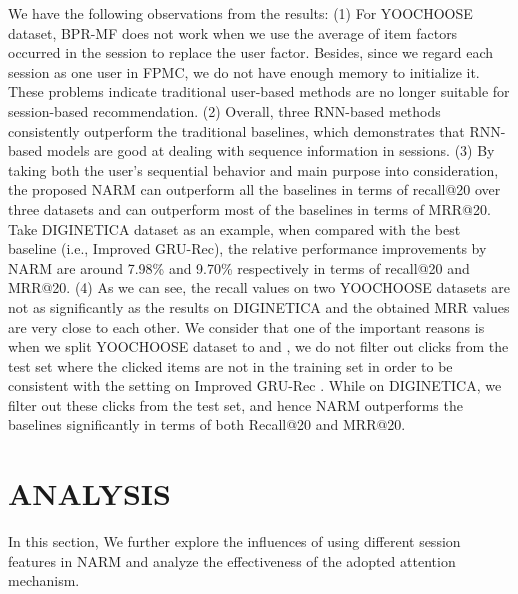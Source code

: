 \documentclass[sigconf]{acmart}
\begin{document}
We have the following observations from the results: (1) For YOOCHOOSE  dataset, BPR-MF does not work when we use the average of item factors occurred in the session to replace the user factor. Besides, since we regard each session as one user in FPMC, we do not have enough memory to initialize it. These problems indicate traditional user-based methods are no longer suitable for session-based recommendation. (2) Overall, three RNN-based methods consistently outperform the traditional baselines, which demonstrates that RNN-based models are good at dealing with sequence information in sessions. (3) By taking both the user's sequential behavior and main purpose into consideration, the proposed NARM can outperform all the baselines in terms of recall@20 over three datasets and can outperform most of the baselines in terms of MRR@20. Take DIGINETICA dataset as an example, when compared with the best baseline (i.e., Improved GRU-Rec), the relative performance improvements by NARM are around 7.98\% and 9.70\% respectively in terms of recall@20 and MRR@20. (4) As we can see, the recall values on two YOOCHOOSE datasets are not as significantly as the results on DIGINETICA and the obtained MRR values are very close to each other. We consider that one of the important reasons is when we split YOOCHOOSE dataset to  and , we do not filter out clicks from the test set where the clicked items are not in the training set in order to be consistent with the setting on Improved GRU-Rec \cite{tan2016improved}. While on DIGINETICA, we filter out these clicks from the test set, and hence NARM outperforms the baselines significantly in terms of both Recall@20 and MRR@20.

\section{ANALYSIS}
In this section, We further explore the influences of using different session features in NARM and analyze the effectiveness of the adopted attention mechanism.
\end{document}
